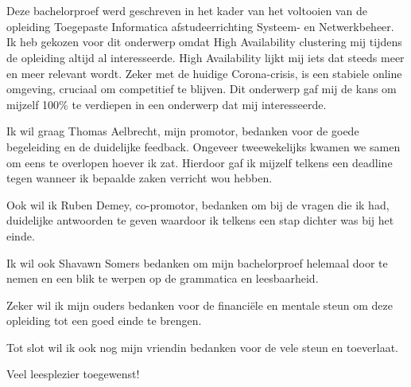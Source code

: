 
\chapter*{}
\label{ch:voorwoord}

Deze bachelorproef werd geschreven in het kader van het voltooien van de opleiding Toegepaste Informatica afstudeerrichting Systeem- en Netwerkbeheer. Ik heb gekozen voor dit onderwerp omdat High Availability clustering mij tijdens de opleiding altijd al interesseerde. High Availability lijkt mij iets dat steeds meer en meer relevant wordt. Zeker met de huidige Corona-crisis, is een stabiele online omgeving, cruciaal om competitief te blijven. Dit onderwerp gaf mij de kans om mijzelf 100\% te verdiepen in een onderwerp dat mij interesseerde.

Ik wil graag Thomas Aelbrecht, mijn promotor, bedanken voor de goede begeleiding en de duidelijke feedback. Ongeveer tweewekelijks kwamen we samen om eens te overlopen hoever ik zat. Hierdoor gaf ik mijzelf telkens een deadline tegen wanneer ik bepaalde zaken verricht wou hebben.

Ook wil ik Ruben Demey, co-promotor, bedanken om bij de vragen die ik had, duidelijke antwoorden te geven waardoor ik telkens een stap dichter was bij het einde.

Ik wil ook Shavawn Somers bedanken om mijn bachelorproef helemaal door te nemen en een blik te werpen op de grammatica en leesbaarheid.

Zeker wil ik mijn ouders bedanken voor de financiële en mentale steun om deze opleiding tot een goed einde te brengen.

Tot slot wil ik ook nog mijn vriendin bedanken voor de vele steun en toeverlaat.

Veel leesplezier toegewenst!